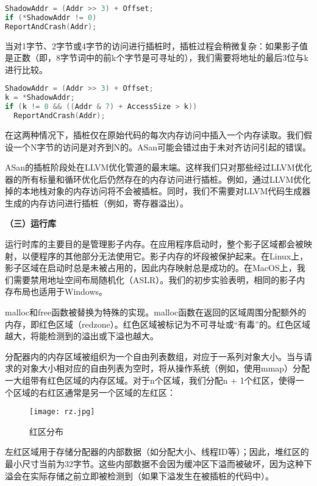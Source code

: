 \begin{lstlisting}[language=C++]
ShadowAddr = (Addr >> 3) + Offset;
if (*ShadowAddr != 0)
ReportAndCrash(Addr);
\end{lstlisting}

当对1字节、2字节或4字节的访问进行插桩时，插桩过程会稍微复杂：如果影子值是正数（即，8字节词中的前k个字节是可寻址的），我们需要将地址的最后3位与k进行比较。

\begin{lstlisting}[language=C++]
ShadowAddr = (Addr >> 3) + Offset;
k = *ShadowAddr;
if (k != 0 && ((Addr & 7) + AccessSize > k))
  ReportAndCrash(Addr);
\end{lstlisting}

在这两种情况下，插桩仅在原始代码的每次内存访问中插入一个内存读取。我们假设一个N字节的访问是对齐到N的。ASan可能会错过由于未对齐访问引起的错误。

ASan的插桩阶段处在LLVM优化管道的最末端。这样我们只对那些经过LLVM优化器的所有标量和循环优化后仍然存在的内存访问进行插桩。例如，通过LLVM优化掉的本地栈对象的内存访问将不会被插桩。同时，我们不需要对LLVM代码生成器生成的内存访问进行插桩（例如，寄存器溢出）。

\textbf{（三）运行库}

运行时库的主要目的是管理影子内存。在应用程序启动时，整个影子区域都会被映射，以便程序的其他部分无法使用它。影子内存的坏段被保护起来。在Linux上，影子区域在启动时总是未被占用的，因此内存映射总是成功的。在MacOS上，我们需要禁用地址空间布局随机化（ASLR）。我们的初步实验表明，相同的影子内存布局也适用于Windows。

malloc和free函数被替换为特殊的实现。malloc函数在返回的区域周围分配额外的内存，即红色区域（redzone）。红色区域被标记为不可寻址或“有毒”的。红色区域越大，将能检测到的溢出或下溢也越大。

分配器内的内存区域被组织为一个自由列表数组，对应于一系列对象大小。当与请求的对象大小相对应的自由列表为空时，将从操作系统（例如，使用mmap）分配一大组带有红色区域的内存区域。对于n个区域，我们分配n + 1个红区，使得一个区域的右红区通常是另一个区域的左红区：

\begin{figure}[ht]
	\centering
	\texttt{[image: rz.jpg]}
	\caption{红区分布}
	\label{fig:rz}
\end{figure}

左红区域用于存储分配器的内部数据（如分配大小、线程ID等）；因此，堆红区的最小尺寸当前为32字节。这些内部数据不会因为缓冲区下溢而被破坏，因为这种下溢会在实际存储之前立即被检测到（如果下溢发生在被插桩的代码中）。


